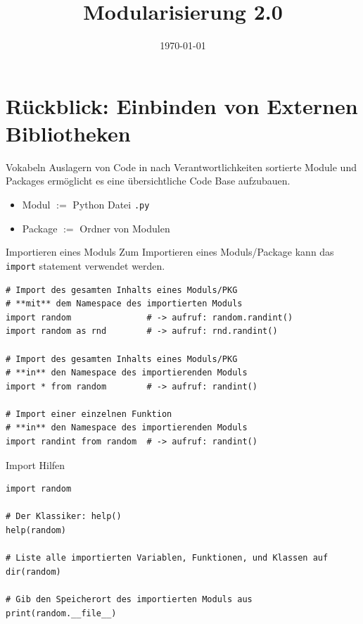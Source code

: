 



\title{Modularisierung 2.0}

\date{\today}




\maketitle

\section{Rückblick: Einbinden von Externen Bibliotheken}

\begin{frame}[fragile]{Vokabeln}
Auslagern von Code in nach Verantwortlichkeiten sortierte Module und Packages ermöglicht es eine übersichtliche Code Base aufzubauen.
\begin{itemize}
\item Modul $:=$ Python Datei \texttt{.py}
\item Package $:=$ \glqq Ordner \grqq von Modulen
\end{itemize}
\end{frame}

\begin{frame}[fragile]{Importieren eines Moduls}
    Zum Importieren eines Moduls/Package kann das \texttt{import} statement verwendet werden.
    \begin{lstlisting}
# Import des gesamten Inhalts eines Moduls/PKG
# **mit** dem Namespace des importierten Moduls
import random               # -> aufruf: random.randint()
import random as rnd        # -> aufruf: rnd.randint()

# Import des gesamten Inhalts eines Moduls/PKG
# **in** den Namespace des importierenden Moduls
import * from random        # -> aufruf: randint()

# Import einer einzelnen Funktion
# **in** den Namespace des importierenden Moduls
import randint from random  # -> aufruf: randint()
    \end{lstlisting}
\end{frame}

\begin{frame}[fragile]{Import Hilfen}

\begin{lstlisting}
import random

# Der Klassiker: help()
help(random)

# Liste alle importierten Variablen, Funktionen, und Klassen auf
dir(random)

# Gib den Speicherort des importierten Moduls aus
print(random.__file__)
\end{lstlisting}
\end{frame}

